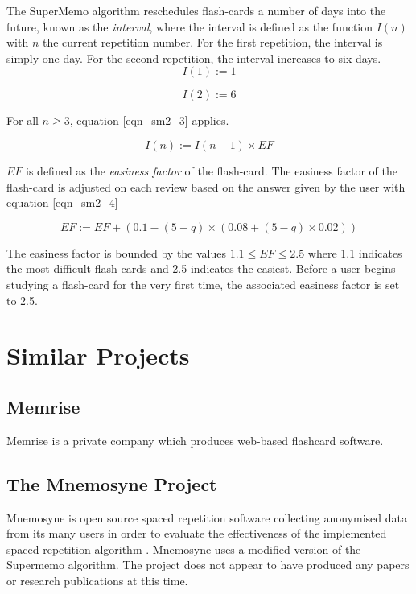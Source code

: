 The SuperMemo algorithm reschedules flash-cards a number of days into the future, known
as the \textit{interval}, where the interval is defined as the function $I(n)$ with $n$ the
current repetition number. For the first repetition, the interval is simply one day.
For the second repetition, the interval increases to six days. 
\begin{equation}
I(1) := 1
\end{equation}

\begin{equation}
I(2) := 6
\end{equation}

For all $n \geq 3$, equation \ref{eqn_sm2_3} applies.

\begin{equation}
\label{eqn_sm2_3}
I(n) := I(n-1) \times EF
\end{equation}

$EF$ is defined as the \textit{easiness factor} of the flash-card. The easiness factor
of the flash-card is adjusted on each review based on the answer given by the user with
equation \ref{eqn_sm2_4}

\begin{equation}
\label{eqn_sm2_4}
EF := EF + (0.1 - (5 - q) \times (0.08 + (5 - q) \times 0.02))
\end{equation}

The easiness factor is bounded by the values $1.1 \leq EF \leq 2.5$ where 1.1 indicates
the most difficult flash-cards and 2.5 indicates the easiest. Before a user begins studying a
flash-card for the very first time, the associated easiness factor is set to 2.5.

\section{Similar Projects} \label{background_similarprojects}
\subsection*{Memrise}
Memrise is a private company which produces web-based flashcard software.

\subsection*{The Mnemosyne Project}
Mnemosyne is open source spaced repetition software collecting anonymised data from its many users in order
to evaluate the effectiveness of the implemented spaced repetition algorithm \cite{peter_bienstman_principles_2012}.
Mnemosyne uses a modified version of the Supermemo algorithm.
The project does not appear to have produced any papers or research publications at this time.

